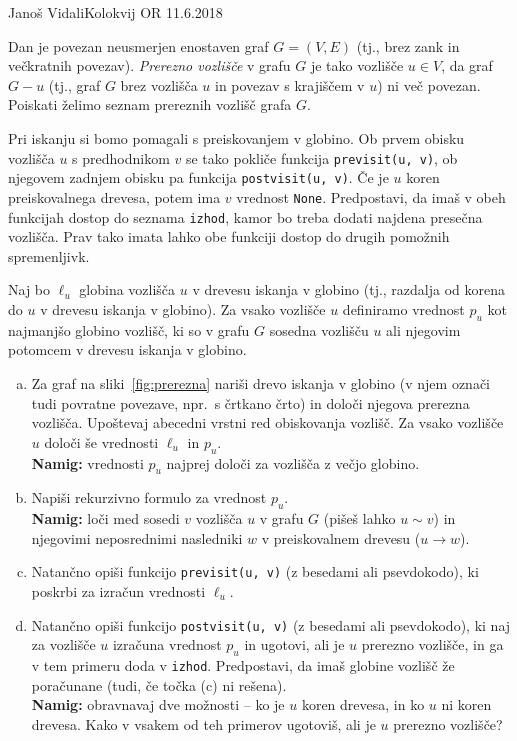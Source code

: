\begin{naloga}{Janoš Vidali}{Kolokvij OR 11.6.2018}
\begin{vprasanje}
Dan je povezan neusmerjen enostaven graf $G = (V, E)$
(tj., brez zank in večkratnih povezav).
{\em Prerezno vozlišče} v grafu $G$ je tako vozlišče $u \in V$,
da graf $G - u$
(tj., graf $G$ brez vozlišča $u$ in povezav s krajiščem v $u$)
ni več povezan.
Poiskati želimo seznam prereznih vozlišč grafa $G$.

Pri iskanju si bomo pomagali s preiskovanjem v globino.
Ob prvem obisku vozlišča $u$ s predhodnikom $v$
se tako pokliče funkcija \verb|previsit(u, v)|,
ob njegovem zadnjem obisku pa funkcija \verb|postvisit(u, v)|.
Če je $u$ koren preiskovalnega drevesa, potem ima $v$ vrednost \verb|None|.
Predpostavi, da imaš v obeh funkcijah dostop do seznama \verb|izhod|,
kamor bo treba dodati najdena presečna vozlišča.
Prav tako imata lahko obe funkciji dostop do drugih pomožnih spremenljivk.

Naj bo $\ell_u$ globina vozlišča $u$ v drevesu iskanja v globino
(tj., razdalja od korena do $u$ v drevesu iskanja v globino).
Za vsako vozlišče $u$ definiramo vrednost $p_u$ kot najmanjšo globino vozlišč,
ki so v grafu $G$ sosedna vozlišču $u$
ali njegovim potomcem v drevesu iskanja v globino.

\begin{enumerate}[(a)]
\item Za graf na sliki~\ref{fig:prerezna} nariši drevo iskanja v globino
(v njem označi tudi povratne povezave, npr.~s črtkano črto)
in določi njegova prerezna vozlišča.
Upoštevaj abecedni vrstni red obiskovanja vozlišč.
Za vsako vozlišče $u$ določi še vrednosti $\ell_u$ in $p_u$. \\
{\small {\bf Namig:}
vrednosti $p_u$ najprej določi za vozlišča z večjo globino.}

\item Napiši rekurzivno formulo za vrednost $p_u$. \\
{\small {\bf Namig:} loči med sosedi $v$ vozlišča $u$ v grafu $G$
(pišeš lahko $u \sim v$)
in njegovimi neposrednimi nasledniki $w$ v preiskovalnem drevesu ($u \to w$).}

\item Natančno opiši funkcijo \verb|previsit(u, v)|
(z besedami ali psevdokodo),
ki poskrbi za izračun vrednosti $\ell_u$.

\item Natančno opiši funkcijo \verb|postvisit(u, v)|
(z besedami ali psevdokodo),
ki naj za vozlišče $u$ izračuna vrednost $p_u$ in ugotovi,
ali je $u$ prerezno vozlišče, in ga v tem primeru doda v \verb|izhod|.
Predpostavi, da imaš globine vozlišč že poračunane
(tudi, če točka (c) ni rešena). \\
{\small {\bf Namig:} obravnavaj dve možnosti --
ko je $u$ koren drevesa, in ko $u$ ni koren drevesa.
Kako v vsakem od teh primerov ugotoviš, ali je $u$ prerezno vozlišče?}


\end{enumerate}
\end{vprasanje}
\end{naloga}
